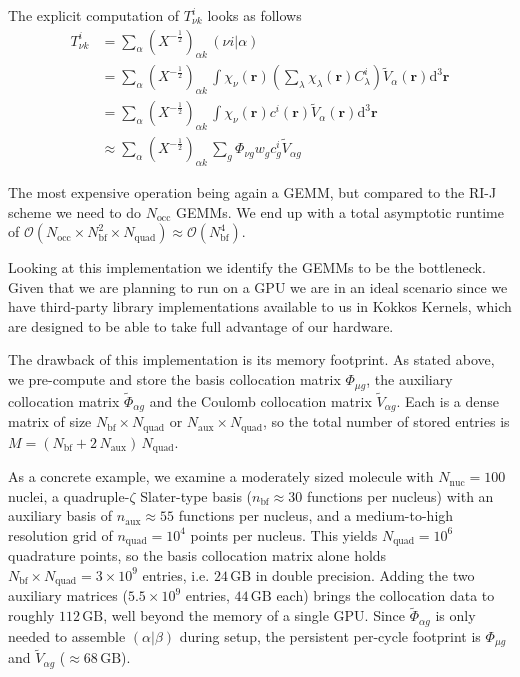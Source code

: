 \documentclass{article}
\begin{document}
The explicit computation of \( T^i_{\nu k } \) looks as follows
\begin{align}
  T^i_{\nu k }
  &=  \sum_\alpha (X^{-\frac{1}{2}})_{\alpha k}\, (\nu i | \alpha ) \\
  &=  \sum_\alpha (X^{-\frac{1}{2}})_{\alpha k}\, \int \chi_\nu(\mathbf r)
  \left(\sum_\lambda \chi_\lambda(\mathbf r)C_{\lambda}^i \right)
  \tilde V_\alpha(\mathbf r) \mathrm d^3 \mathbf r \\ 
  &= \sum_\alpha (X^{-\frac{1}{2}})_{\alpha k}\, \int
  \chi_\nu(\mathbf r) c^i(\mathbf r)
  \tilde V_\alpha(\mathbf r) \mathrm d^3 \mathbf r \\
  &\approx \sum_\alpha (X^{-\frac{1}{2}})_{\alpha k}\, \sum_g
  \Phi_{\nu g} w_ g c^{i}_{g}
  \tilde V_{\alpha g}
\end{align}

The most expensive operation being again a GEMM, but compared to the
RI-J scheme we need to do \( N_\text{occ} \) GEMMs. We end up with
a total asymptotic runtime of
\( \mathcal O(N_\text{occ} \times N_\text{bf}^2 \times
N_\text{quad}) \approx \mathcal O (N_\text{bf}^4) \).

Looking at this implementation we identify the GEMMs to be the
bottleneck. Given that we are planning to run on a GPU we are in an
ideal scenario since we have third-party library implementations
available to us in Kokkos Kernels, which are designed to be able to take full
advantage of our hardware.

The drawback of this implementation is its memory footprint. As stated
above, we pre-compute and store the basis collocation matrix
\(\Phi_{\mu g}\), the auxiliary collocation matrix \(\tilde\Phi_{\alpha g}\)
and the Coulomb collocation matrix \(\tilde V_{\alpha g}\). Each is a dense
matrix of size \(N_\text{bf}\times N_\text{quad}\) or
\(N_\text{aux}\times N_\text{quad}\), so the total number of stored
entries is \( M = (N_\text{bf} + 2\,N_\text{aux})\,N_\text{quad} \).

As a concrete example, we examine a moderately sized molecule with
\(N_\text{nuc}=100\) nuclei, a quadruple-\(\zeta\) Slater-type basis
(\(n_\text{bf}\approx 30\) functions per nucleus) with an auxiliary basis
of \(n_\text{aux}\approx 55\) functions per nucleus, and a medium-to-high
resolution grid of \(n_\text{quad}=10^4\) points per nucleus. This yields
\(N_\text{quad}=10^6\) quadrature points, so the basis collocation matrix
alone holds \(N_\text{bf}\times N_\text{quad}=3\times10^9\) entries, i.e.
\(24\,\text{GB}\) in double precision. Adding the two auxiliary matrices
(\(5.5\times10^9\) entries, \(44\,\text{GB}\) each) brings the collocation
data to roughly \(112\,\text{GB}\), well beyond the memory of a single GPU.
Since \(\tilde\Phi_{\alpha g}\) is only needed to assemble
\((\alpha|\beta)\) during setup, the persistent per-cycle footprint is
\(\Phi_{\mu g}\) and \(\tilde V_{\alpha g}\) (\(\approx 68\,\text{GB}\)).
\end{document}
